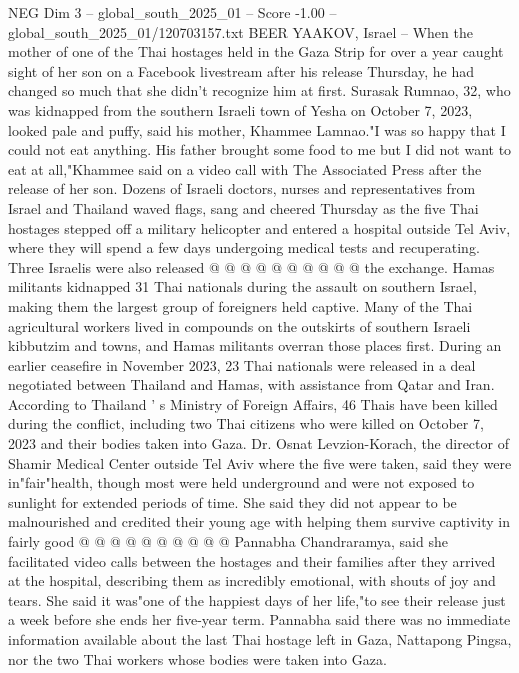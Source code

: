 \begin{textsample}{NEG Dim 3 – global\_south\_2025\_01 – Score -1.00 – global\_south\_2025\_01/120703157.txt}  \label{ex:f3_neg_051}
BEER YAAKOV, Israel -- When the mother of one of the Thai hostages held in the Gaza Strip for over a year caught sight of her son on a Facebook livestream after his release Thursday, he had changed so much that she didn't recognize him at first.
Surasak Rumnao, 32, who was kidnapped from the southern Israeli town of Yesha on October 7, 2023, looked pale and puffy, said his mother, Khammee Lamnao."I was so happy that I could not eat anything.
His father brought some food to me but I did not want to eat at all,"Khammee said on a video call with The Associated Press after the release of her son.
Dozens of Israeli doctors, nurses and representatives from Israel and Thailand waved flags, sang and cheered Thursday as the five Thai hostages stepped off a military helicopter and entered a hospital outside Tel Aviv, where they will spend a few days undergoing medical tests and recuperating.
Three Israelis were also released @ @ @ @ @ @ @ @ @ @ the exchange.
Hamas militants kidnapped 31 Thai nationals during the assault on southern Israel, making them the largest group of foreigners held captive.
Many of the Thai agricultural workers lived in compounds on the outskirts of southern Israeli kibbutzim and towns, and Hamas militants overran those places first.
During an earlier ceasefire in November 2023, 23 Thai nationals were released in a deal negotiated between Thailand and Hamas, with assistance from Qatar and Iran.
According to Thailand ' s Ministry of Foreign Affairs, 46 Thais have been killed during the conflict, including two Thai citizens who were killed on October 7, 2023 and their bodies taken into Gaza.
Dr.
Osnat Levzion-Korach, the director of Shamir Medical Center outside Tel Aviv where the five were taken, said they were in"fair"health, though most were held underground and were not exposed to sunlight for extended periods of time.
She said they did not appear to be malnourished and credited their young age with helping them survive captivity in fairly good @ @ @ @ @ @ @ @ @ @ Pannabha Chandraramya, said she facilitated video calls between the hostages and their families after they arrived at the hospital, describing them as incredibly emotional, with shouts of joy and tears.
She said it was"one of the happiest days of her life,"to see their release just a week before she ends her five-year term.
Pannabha said there was no immediate information available about the last Thai hostage left in Gaza, Nattapong Pingsa, nor the two Thai workers whose bodies were taken into Gaza.

\end{textsample}
